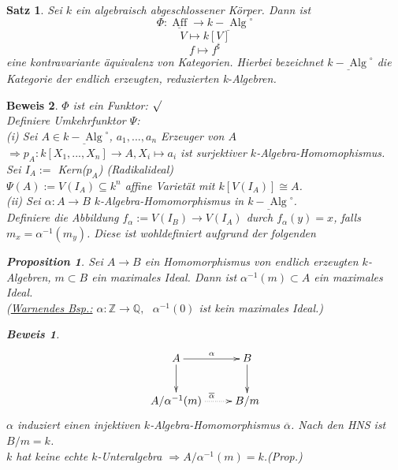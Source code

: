 \documentclass[a4paper,12pt]{report}
\theoremstyle{break}
\newtheorem{Satz}{Satz}
\newtheorem{Prop}[Def]{Proposition}
\theoremstyle{nonumberbreak}
\newtheorem{Bew}{Beweis}
\theoremstyle{nonumberplain}
\begin{document}
\begin{Satz}
Sei $k$ ein algebraisch abgeschlossener Körper. Dann ist 
$$\Phi:\underline{\operatorname{Aff}} \longrightarrow \underline{k-\operatorname{Alg}}^{\circ}$$
$$V \longmapsto k[V]$$
$$f\longmapsto f^{\sharp}$$
eine kontravariante äquivalenz von Kategorien.
Hierbei bezeichnet $\underline{k-\operatorname{Alg}}^{\circ}$ die Kategorie der endlich erzeugten, reduzierten k-Algebren.
\end{Satz}
\begin{Bew}
$\Phi$ ist ein Funktor: $\surd$\\
Definiere Umkehrfunktor $\Psi$:~\\
(i) Sei $A\in \underline{k-\operatorname{Alg}}^{\circ}$, $a_1,...,a_n$ Erzeuger von $A$\\
$\Rightarrow p_A: k[X_1,...,X_n] \rightarrow A, X_i \mapsto a_i$ ist surjektiver $k$-Algebra-Homomophismus.\\
Sei $I_A:=$ Kern($p_A$) (Radikalideal)\\
$\Psi(A):= V(I_A)\subseteq k^n$ affine Varietät mit $k[V(I_A)]\cong A$.\\
(ii) Sei $\alpha: A\rightarrow B$ $k$-Algebra-Homomorphismus in $\underline{k-\operatorname{Alg}}^{\circ}$.\\
Definiere die Abbildung $f_{\alpha} := V(I_B) \rightarrow V(I_A)$ durch $f_{\alpha}(y)=x$, falls $m_x=\alpha^{-1}(m_y)$. Diese ist wohldefiniert aufgrund der folgenden 
\begin{Prop}
Sei $A\rightarrow B$ ein Homomorphismus von endlich erzeugten $k$-Algebren, $m\subset B$ ein maximales Ideal. Dann ist $\alpha^{-1}(m)\subset A$ ein maximales Ideal.\\
(\underline{Warnendes Bsp.:} $\alpha:\mathbb{Z}\rightarrow \mathbb{Q},~~~ \alpha^{-1}(0)$ ist kein maximales Ideal.) 
\end{Prop}
\begin{Bew}
\[
\begin{xy}
\xymatrix{
A\ar[r]^{\alpha}\ar[d]&B\ar[d] \\
A/\alpha^{-1}(m)\ar@{.>}[r]^{\overline{\alpha}}&B/m
}
\end{xy}
\]
$\alpha$ induziert einen injektiven $k$-Algebra-Homomorphismus $\overline{\alpha}$. Nach den HNS ist $B/m=k$.\\
$k$ hat keine echte $k$-Unteralgebra $\Rightarrow A/\alpha^{-1}(m)=k$.(Prop.)\\
\end{Bew}

\end{Bew}
\end{document}
